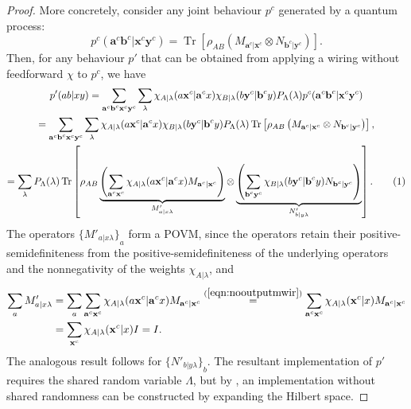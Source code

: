 \documentclass[10pt, a4paper]{article}
\numberwithin{equation}{section} %
\theoremstyle{definition}
\theoremstyle{plain}
\newcommand{\usenumber}{%
  \refstepcounter{equation}\tag{\theequation}
}
\newcommand{\?}{\mathrel{?}} %
\newcommand{\cvec}[1]{\boldsymbol{\mathbf{#1}}}    %
\newcommand{\Tr}[2][]{\mathop{\mathrm{Tr}#1}\left[ #2 \right]} %
\begin{document}
\begin{proof}
                    More concretely, consider any joint behaviour \(p^c\) generated by a quantum process:
                    \begin{equation}
                      p^c(\cvec{a}^c\cvec{b}^c|\cvec{x}^c\cvec{y}^c) = \Tr{\rho_{AB} \left( M_{\cvec{a}^c|\cvec{x}^c} \otimes N_{\cvec{b}^c|\cvec{y}^c} \right) }.
                    \end{equation}
                    Then, for any behaviour \(p'\) that can be obtained from applying a wiring without feedforward \(\chi\) to \(p^c\), we have
                    \begin{gather*}
                      p'(ab|xy) = \sum_{\cvec{a}^c\cvec{b}^c\cvec{x}^c\cvec{y}^c} \sum_{\lambda} \chi_{A|\lambda}(a\cvec{x}^c|\cvec{a}^cx) \chi_{B|\lambda}(b\cvec{y}^c|\cvec{b}^cy) P_{\Lambda}(\lambda) p^c(\cvec{a}^c\cvec{b}^c|\cvec{x}^c\cvec{y}^c) \\
                      = \sum_{\cvec{a}^c\cvec{b}^c\cvec{x}^c\cvec{y}^c} \sum_{\lambda} \chi_{A|\lambda}(a\cvec{x}^c|\cvec{a}^cx) \chi_{B|\lambda}(b\cvec{y}^c|\cvec{b}^cy) P_{\Lambda}(\lambda) \Tr{\rho_{AB} \left( M_{\cvec{a}^c|\cvec{x}^c} \otimes N_{\cvec{b}^c|\cvec{y}^c} \right) }, \\
                      = \sum_{\lambda} P_{\Lambda}(\lambda) \Tr{\rho_{AB} \underbrace{\left( \sum_{\cvec{a}^c\cvec{x}^c} \chi_{A|\lambda}(a\cvec{x}^c|\cvec{a}^cx) M_{\cvec{a}^c|\cvec{x}^c} \right)}_{M'_{a|x\lambda}} \otimes \underbrace{\left(\sum_{\cvec{b}^c\cvec{y}^c} \chi_{B|\lambda}(b\cvec{y}^c|\cvec{b}^cy) N_{\cvec{b}^c|\cvec{y}^c} \right)}_{N'_{b|y\lambda}} }. \usenumber
                    \end{gather*}
                    The operators \({\{M'_{a|x\lambda}\}}_a\) form a POVM, since the operators retain their positive-semidefiniteness from the positive-semidefiniteness of the underlying operators and the nonnegativity of the weights \(\chi_{A|\lambda}\), and
                    \begin{align*}
                      \sum_a M'_{a|x\lambda} &= \sum_a \sum_{\cvec{a}^c\cvec{x}^c} \chi_{A|\lambda}(a\cvec{x}^c|\cvec{a}^cx) M_{\cvec{a}^c|\cvec{x}^c} \stackrel{(\ref{eqn:nooutputmwir})}{=} \sum_{\cvec{a}^c\cvec{x}^c} \chi_{A|\lambda}(\cvec{x}^c|x) M_{\cvec{a}^c|\cvec{x}^c} \\
                                             &= \sum_{\cvec{x}^c} \chi_{A|\lambda}(\cvec{x}^c|x) I = I.
                    \end{align*}
                    The analogous result follows for \({\{N'_{b|y\lambda}\}}_b\). The resultant implementation of \(p'\) requires the shared random variable \(\Lambda\), but by , an implementation without shared randomness can be constructed by expanding the Hilbert space.


\end{proof}
\end{document}
